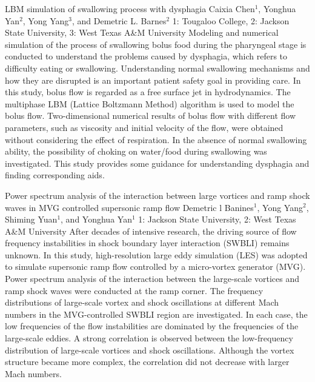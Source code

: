 \begin{addmargin}[2em]{0em}
\vspace{1.5ex}
\abs
{LBM simulation of swallowing process with dysphagia}
{Caixia Chen$^{1}$, Yonghua Yan$^{2}$, Yong Yang$^{3}$, and Demetric L. Barnes$^{2}$}
{1: Tougaloo College, 2: Jackson State University, 3: West Texas A\&M University}
{Modeling and numerical simulation of the process of swallowing bolus food during the pharyngeal stage is conducted to understand the problems caused by dysphagia, which refers to difficulty eating or swallowing. Understanding normal swallowing mechanisms and how they are disrupted is an important patient safety goal in providing care. In this study, bolus flow is regarded as a free surface jet in hydrodynamics. The multiphase LBM (Lattice Boltzmann Method) algorithm is used to model the bolus flow. Two-dimensional numerical results of bolus flow with different flow parameters, such as viscosity and initial velocity of the flow, were obtained without considering the effect of respiration. In the absence of normal swallowing ability, the possibility of choking on water/food during swallowing was investigated. This study provides some guidance for understanding dysphagia and finding corresponding aids.}


\vspace{1.5ex}
\abs
{Power spectrum analysis of the interaction between large vortices and ramp shock waves in MVG controlled supersonic ramp flow}
{Demetric l Banines$^{1}$, Yong Yang$^{2}$, Shiming Yuan$^{1}$, and Yonghua Yan$^{1}$}
{1: Jackson State University, 2: West Texas A\&M University}
{After decades of intensive research, the driving source of flow frequency instabilities in shock boundary layer interaction (SWBLI) remains unknown. In this study, high-resolution large eddy simulation (LES) was adopted to simulate supersonic ramp flow controlled by a micro-vortex generator (MVG). Power spectrum analysis of the interaction between the large-scale vortices and ramp shock waves were conducted at the ramp corner. The frequency distributions of large-scale vortex and shock oscillations at different Mach numbers in the MVG-controlled SWBLI region are investigated. In each case, the low frequencies of the flow instabilities are dominated by the frequencies of the large-scale eddies. A strong correlation is observed between the low-frequency distribution of large-scale vortices and shock oscillations. Although the vortex structure became more complex, the correlation did not decrease with larger Mach numbers.}
\end{addmargin}

